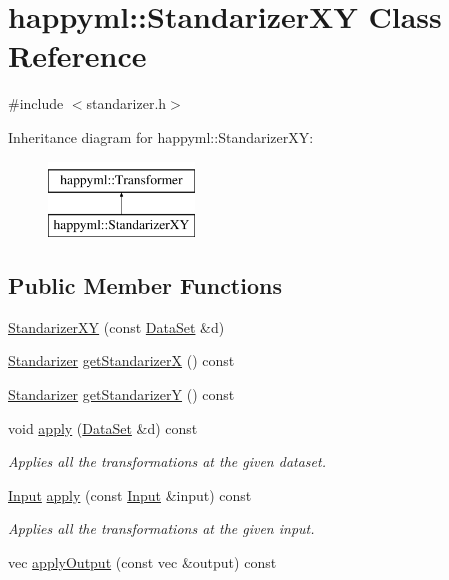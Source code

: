 \hypertarget{classhappyml_1_1StandarizerXY}{}\section{happyml\+:\+:Standarizer\+XY Class Reference}
\label{classhappyml_1_1StandarizerXY}


{\ttfamily \#include $<$standarizer.\+h$>$}

Inheritance diagram for happyml\+:\+:Standarizer\+XY\+:\begin{figure}[H]
\begin{center}
\leavevmode
\includegraphics[height=2.000000cm]{classhappyml_1_1StandarizerXY}
\end{center}
\end{figure}
\subsection*{Public Member Functions}
\begin{DoxyCompactItemize}
\item 
\hyperlink{classhappyml_1_1StandarizerXY_a49f04a43ba7eff7fbb5694ee7b291f1b}{Standarizer\+XY} (const \hyperlink{classhappyml_1_1DataSet}{Data\+Set} \&d)
\item 
\hyperlink{classhappyml_1_1Standarizer}{Standarizer} \hyperlink{classhappyml_1_1StandarizerXY_ada7856e988a0e49d97ad49c7e5f2858f}{get\+StandarizerX} () const 
\item 
\hyperlink{classhappyml_1_1Standarizer}{Standarizer} \hyperlink{classhappyml_1_1StandarizerXY_a72864006fa4aa7cdf279921b7fbe397f}{get\+StandarizerY} () const 
\item 
void \hyperlink{classhappyml_1_1StandarizerXY_af2979980c88b3c5c4d670d2148c148e8}{apply} (\hyperlink{classhappyml_1_1DataSet}{Data\+Set} \&d) const 
\begin{DoxyCompactList}\small\item\em Applies all the transformations at the given dataset. \end{DoxyCompactList}\item 
\hyperlink{namespacehappyml_a03602d1ec49393790b8a0449f40cd01f}{Input} \hyperlink{classhappyml_1_1StandarizerXY_a800a8953dbf96c26edca660680ce791f}{apply} (const \hyperlink{namespacehappyml_a03602d1ec49393790b8a0449f40cd01f}{Input} \&input) const 
\begin{DoxyCompactList}\small\item\em Applies all the transformations at the given input. \end{DoxyCompactList}\item 
vec \hyperlink{classhappyml_1_1StandarizerXY_af42c8a94bd29b9e75b6deb770a391460}{apply\+Output} (const vec \&output) const 
\end{DoxyCompactItemize}
